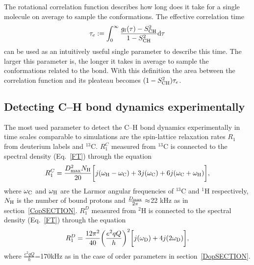 \documentclass[aps,prl,superscriptaddress,twocolumn]{revtex4}
\begin{document}
The rotational correlation function describes how long does it take for a single molecule
on average to sample the conformations. The effective correlation time 
\begin{equation}\label{effCTdef}
\tau_{e}:=\int_0^{\infty} \frac{g_{\rm{f}}(\tau)-S_{\rm{CH}}^2}{1-S_{\rm{CH}}^2} \mathrm{d}\tau
\end{equation} 
can be used as an intuitively useful single parameter to describe this time. 
The larger this parameter is, the longer it takes in average to sample the conformations related to the
bond. With this definition the area between the correlation function and its pleateau becomes $(1-S_{\rm{CH}}^2)\tau_{e}$.

\subsection{Detecting C--H bond dynamics experimentally}

The most used parameter to detect the C--H bond dynamics experimentally in time scales comparable to simulations
are the spin-lattice relaxation rates $R_1$ from deuterium labels and $^{13}$C. 
$R_1^{C}$ measured from $^{13}$C is connected to the spectral density (Eq.~\ref{FT}) through the equation
\begin{equation}\label{R1C}
R_{1}^{C}=\frac{D_{\rm{max}}^2N_{\rm{H}}}{20}\bigg[j(\omega_{\rm{H}}-\omega_{\rm{C}})+3j(\omega_{\rm{C}})+6j(\omega_{\rm{C}}+\omega_{\rm{H}})\bigg],
\end{equation}
where $\omega_{\rm{C}}$ and $\omega_{\rm{H}}$ are the Larmor angular frequencies of $^{13}$C and $^1$H respectively, 
$N_{\rm{H}}$ is the number of bound protons and $\frac{D_{\rm{max}}}{2\pi}\approx$22 kHz as in section~\ref{CopSECTION}.
$R_1^{D}$ measured from $^2$H is connected to the spectral density (Eq.~\ref{FT}) through the equation
\begin{equation}\label{R1D}
R_{1}^{D}=\frac{12\pi^2}{40}\bigg(\frac{e^2qQ}{h}\bigg)^2\bigg[j(\omega_{\rm{D}})+4j(2\omega_{\rm{D}})\bigg],
\end{equation}
where $\frac{e^2qQ}{h}$=170kHz as in the case of order parameters in section~\ref{DopSECTION}.
\end{document}
